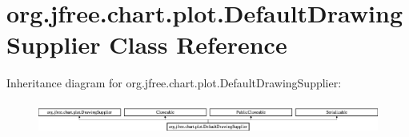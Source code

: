 \hypertarget{classorg_1_1jfree_1_1chart_1_1plot_1_1_default_drawing_supplier}{}\section{org.\+jfree.\+chart.\+plot.\+Default\+Drawing\+Supplier Class Reference}
\label{classorg_1_1jfree_1_1chart_1_1plot_1_1_default_drawing_supplier}
Inheritance diagram for org.\+jfree.\+chart.\+plot.\+Default\+Drawing\+Supplier\+:\begin{figure}[H]
\begin{center}
\leavevmode
\includegraphics[height=1.060606cm]{classorg_1_1jfree_1_1chart_1_1plot_1_1_default_drawing_supplier}
\end{center}
\end{figure}
